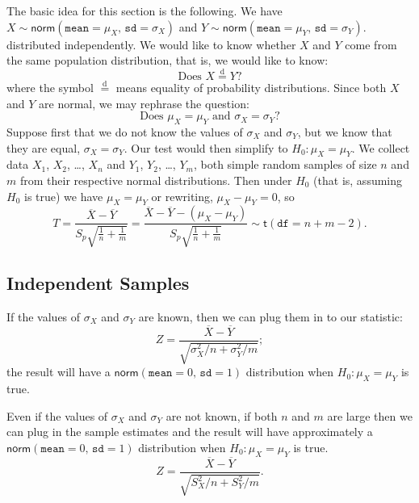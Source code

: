 \documentclass[captions=tableheading]{scrbook}
\begin{document}
The basic idea for this section is the following. We have \(X\sim\mathsf{norm}(\mathtt{mean}=\mu_{X},\,\mathtt{sd}=\sigma_{X})\) and \(Y\sim\mathsf{norm}(\mathtt{mean}=\mu_{Y},\,\mathtt{sd}=\sigma_{Y})\). distributed independently. We would like to know whether \(X\) and \(Y\) come from the same population distribution, that is, we would like to know:
\begin{equation}
\mbox{Does }X\overset{\mathrm{d}}{=}Y?
\end{equation}
where the symbol \(\overset{\mathrm{d}}{=}\) means equality of probability distributions.
Since both \(X\) and \(Y\) are normal, we may rephrase the question:
\begin{equation}
\mbox{Does }\mu_{X}=\mu_{Y}\mbox{ and }\sigma_{X}=\sigma_{Y}?
\end{equation}
Suppose first that we do not know the values of \(\sigma_{X}\) and \(\sigma_{Y}\), but we know that they are equal, \(\sigma_{X}=\sigma_{Y}\). Our test would then simplify to \(H_{0}:\mu_{X}=\mu_{Y}\). We collect data \(X_{1}\), \(X_{2}\), \ldots{}, \(X_{n}\) and \(Y_{1}\), \(Y_{2}\), \ldots{}, \(Y_{m}\), both simple random samples of size \(n\) and \(m\) from their respective normal distributions. Then under \(H_{0}\) (that is, assuming \(H_{0}\) is true) we have \(\mu_{X}=\mu_{Y}\) or rewriting, \(\mu_{X}-\mu_{Y}=0\), so 
\begin{equation}
T=\frac{\overline{X}-\overline{Y}}{S_{p}\sqrt{\frac{1}{n}+\frac{1}{m}}}=\frac{\overline{X}-\overline{Y}-(\mu_{X}-\mu_{Y})}{S_{p}\sqrt{\frac{1}{n}+\frac{1}{m}}}\sim\mathsf{t}(\mathtt{df}=n+m-2).
\end{equation}
\subsection{Independent Samples}
\label{sec-10-4-1}


\begin{rem}
If the values of \(\sigma_{X}\) and \(\sigma_{Y}\) are known, then we can plug them in to our statistic:
\begin{equation} 
Z=\frac{\overline{X}-\overline{Y}}{\sqrt{\sigma_{X}^{2}/n+\sigma_{Y}^{2}/m}};
\end{equation}
the result will have a \(\mathsf{norm}(\mathtt{mean}=0,\,\mathtt{sd}=1)\) distribution when \(H_{0}:\mu_{X}=\mu_{Y}\) is true. 
\end{rem}

\begin{rem}
Even if the values of \(\sigma_{X}\) and \(\sigma_{Y}\) are not known, if both \(n\) and \(m\) are large then we can plug in the sample estimates and the result will have approximately a \(\mathsf{norm}(\mathtt{mean}=0,\,\mathtt{sd}=1)\) distribution when \(H_{0}:\mu_{X}=\mu_{Y}\) is true.
\begin{equation} 
Z=\frac{\overline{X}-\overline{Y}}{\sqrt{S_{X}^{2}/n+S_{Y}^{2}/m}}.
\end{equation}
\end{rem}
\end{document}
